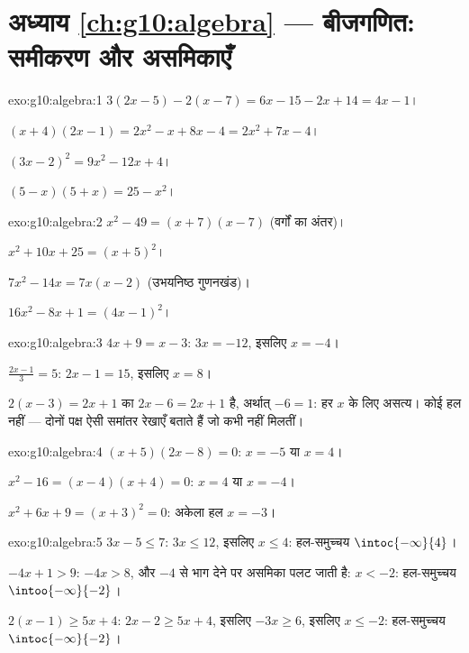 \section*{अध्याय \ref{ch:g10:algebra} --- बीजगणित: समीकरण और असमिकाएँ}

\begin{solution}{exo:g10:algebra:1}
$3(2x-5) - 2(x-7) = 6x - 15 - 2x + 14 = 4x - 1$।

$(x+4)(2x-1) = 2x^2 - x + 8x - 4 = 2x^2 + 7x - 4$।

$(3x-2)^2 = 9x^2 - 12x + 4$।

$(5-x)(5+x) = 25 - x^2$।
\end{solution}

\begin{solution}{exo:g10:algebra:2}
$x^2 - 49 = (x+7)(x-7)$ (वर्गों का अंतर)।

$x^2 + 10x + 25 = (x+5)^2$।

$7x^2 - 14x = 7x(x - 2)$ (उभयनिष्ठ गुणनखंड)।

$16x^2 - 8x + 1 = (4x - 1)^2$।
\end{solution}

\begin{solution}{exo:g10:algebra:3}
$4x + 9 = x - 3$: $3x = -12$, इसलिए $x = -4$।

$\frac{2x-1}{3} = 5$: $2x - 1 = 15$, इसलिए $x = 8$।

$2(x-3) = 2x + 1$ का  $2x - 6 = 2x + 1$ है, अर्थात् $-6 = 1$: हर $x$ के लिए असत्य। कोई हल नहीं ---
दोनों पक्ष ऐसी समांतर रेखाएँ बताते हैं जो कभी नहीं मिलतीं।
\end{solution}

\begin{solution}{exo:g10:algebra:4}
$(x+5)(2x-8) = 0$: $x = -5$ या $x = 4$।

$x^2 - 16 = (x-4)(x+4) = 0$: $x = 4$ या $x = -4$।

$x^2 + 6x + 9 = (x+3)^2 = 0$: अकेला हल $x = -3$।
\end{solution}

\begin{solution}{exo:g10:algebra:5}
$3x - 5 \leq 7$: $3x \leq 12$, इसलिए $x \leq 4$: हल-समुच्चय $\intoc{-\infty}{4}$।

$-4x + 1 > 9$: $-4x > 8$, और $-4$ से भाग देने पर असमिका पलट जाती है: $x < -2$: हल-समुच्चय
$\intoo{-\infty}{-2}$।

$2(x-1) \geq 5x + 4$: $2x - 2 \geq 5x + 4$, इसलिए $-3x \geq 6$, इसलिए $x \leq -2$: हल-समुच्चय $\intoc{-\infty}{-2}$।
\end{solution}

